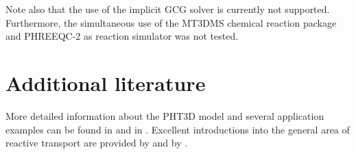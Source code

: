 Note also that the use of the implicit GCG solver is currently not supported.
Furthermore, the simultaneous use of the MT3DMS chemical reaction
package and PHREEQC-2 as reaction simulator was not tested.

\section{Additional literature}

More detailed information about the PHT3D model and several application 
examples can be found in \cite{pht3d} and in \cite{prommer_gw}. Excellent introductions
into the general area of reactive transport are provided by \cite{steefel96} and by \cite{ap2005}. 

